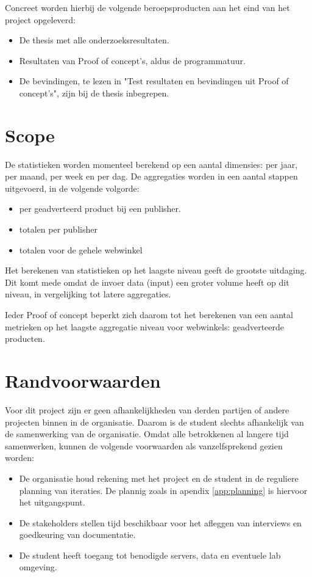     Concreet worden hierbij de volgende beroepsproducten aan het eind van het project opgeleverd:
    
    \begin{itemize}
    \item De thesis met alle onderzoeksresultaten.
    \item Resultaten van Proof of concept's, aldus de programmatuur.
    \item De bevindingen, te lezen in "Test resultaten en bevindingen uit Proof of concept's", zijn bij de thesis inbegrepen.
    \end{itemize}
    
\newpage

\section{Scope}

De statistieken worden momenteel berekend op een aantal dimensies: per jaar, per maand, per week en per dag. De aggregaties worden in een aantal stappen uitgevoerd, in de volgende volgorde:
\begin{itemize}
\item per geadverteerd product bij een publisher.
\item totalen per publisher
\item totalen voor de gehele webwinkel
\end{itemize}
Het berekenen van statistieken op het laagste niveau geeft de grootste uitdaging. Dit komt mede omdat de invoer data (input) een groter volume heeft op dit niveau, in vergelijking tot latere aggregaties.

Ieder Proof of concept beperkt zich daarom tot het berekenen van een aantal metrieken op het laagste aggregatie niveau voor webwinkels: geadverteerde producten.


\section{Randvoorwaarden}

Voor dit project zijn er geen afhankelijkheden van derden partijen of andere projecten binnen in de organisatie. Daarom is de student slechts afhankelijk van de samenwerking van de organisatie. Omdat alle betrokkenen al langere tijd samenwerken, kunnen de volgende voorwaarden als vanzelfsprekend gezien worden:

\begin{itemize}
    \item De organisatie houd rekening met het project en de student in de reguliere planning van iteraties. De plannig zoals in apendix  \ref{app:planning} is hiervoor het uitgangspunt.
    \item De stakeholders stellen tijd beschikbaar voor het afleggen van interviews en goedkeuring van documentatie.
    \item De student heeft toegang tot benodigde servers, data en eventuele lab omgeving.
\end{itemize}

